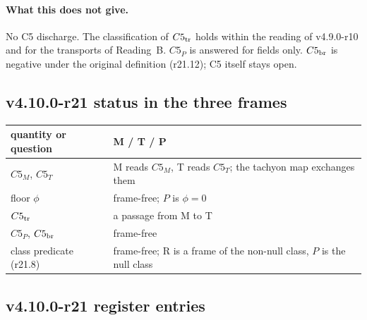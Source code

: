 \paragraph{What this does not give.}
No C5 discharge.  The classification of \(C5_{\rm tr}\) holds within the reading of v4.9.0-r10 and for the transports of Reading~B.
\(C5_P\) is answered for fields only.  \(C5_{\rm br}\) is negative under the original definition (r21.12); C5 itself stays open.

\subsection*{v4.10.0-r21 status in the three frames}
\label{subsec:v4100-r21-frames}

\begin{center}
\small
\begin{tabular}{@{}>{\raggedright\arraybackslash}p{}>{\raggedright\arraybackslash}p{}@{}}
\toprule
quantity or question & M / T / P\\
\midrule
\(C5_M\), \(C5_T\) & M reads \(C5_M\), T reads \(C5_T\); the tachyon map exchanges them\\
floor \(\phi\) & frame-free; \(P\) is \(\phi=0\)\\
\(C5_{\rm tr}\) & a passage from M to T\\
\(C5_P\), \(C5_{\rm br}\) & frame-free\\
class predicate (r21.8) & frame-free; R is a frame of the non-null class, \(P\) is the null class\\
\bottomrule
\end{tabular}
\end{center}

\subsection*{v4.10.0-r21 register entries}
\label{subsec:v4100-r21-register}

